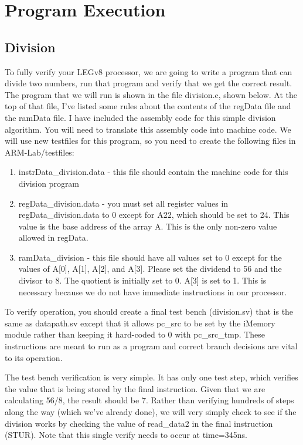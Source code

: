 \chapter{Program Execution}

\section{Division}
To fully verify your LEGv8 processor, we are going to write a program that can divide two numbers, run that program and verify that we get the correct result.  The program that we will run is shown in the file division.c, shown below.  At the top of that file, I've listed some rules about the contents of the regData file and the ramData file.  I have included the assembly code for this simple division algorithm.  You will need to translate this assembly code into machine code.  We will use new testfiles for this program, so you need to create the following files in ARM-Lab/testfiles:
\begin{enumerate}
	\item instrData\_division.data - this file should contain the machine code for this division program 
	\item regData\_division.data - you must set all register values in regData\_division.data to 0 except for A22, which should be set to 24.  This value is the base address of the array A.  This is the only non-zero value allowed in regData.  
	\item ramData\_division -  this file should have all values set to 0 except for the values of A[0], A[1], A[2], and A[3].  Please set the dividend to 56 and the divisor to 8.  The quotient is initially set to 0.  A[3] is set to 1.  This is necessary because we do not have immediate instructions in our processor.
\end{enumerate}

To verify operation, you should create a final test bench (division.sv) that is the same as datapath.sv except that it allows pc\_src to be set by the iMemory module rather than keeping it hard-coded to 0 with pc\_src\_tmp.  These instructions are meant to run as a program and correct branch decisions are vital to its operation.  

The test bench verification is very simple.  It has only one test step, which verifies the value that is being stored by the final instruction.  Given that we are calculating 56/8, the result should be 7.  Rather than verifying hundreds of steps along the way (which we've already done), we will very simply check to see if the division works by checking the value of read\_data2 in the final instruction (STUR). Note that this single verify needs to occur at time=345ns.  

